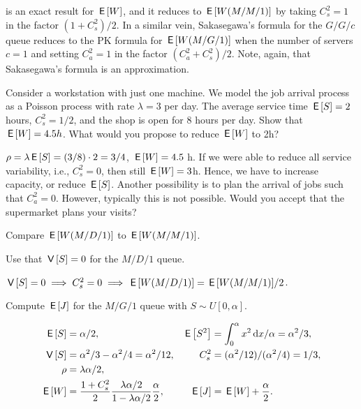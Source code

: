  is an exact result for $\,\mathsf{E}\left[W\right]$, and it reduces to $\,\mathsf{E}\left[W(M/M/1)\right]$ by taking
$C_s^2=1$ in the factor $(1+C_s^2)/2$.
In a similar vein, Sakasegawa's formula for the $G/G/c$ queue reduces to the PK formula for $\,\mathsf{E}\left[W(M/G/1)\right]$ when the number of servers $c=1$ and setting
 $C_a^2=1$ in the factor $(C_a^2+C_s^2)/2$.
Note, again, that Sakasegawa's formula is an approximation.




\begin{exercise}\label{ex:l-241}
 Consider a workstation with just one machine.
 We model the job arrival process as a Poisson process with rate $\lambda=3$ per day.
 The average service time $\,\mathsf{E}\left[S\right] = 2$ hours, $C^2_s = 1/2$, and the shop is open for 8 hours per day.
Show that  $\,\mathsf{E}\left[W\right] = 4.5h$. What would you propose to reduce $\,\mathsf{E}\left[W\right]$ to 2h?
\begin{solution}
$\rho = \lambda \,\mathsf{E}\left[S\right] = (3/8)\cdot 2 = 3/4$, $\,\mathsf{E}\left[W\right] = 4.5$ h.
If we were able to reduce all service variability, i.e., $C_s^2=0$, then still $\,\mathsf{E}\left[W\right] = 3$h.
Hence, we have to increase capacity, or reduce $\,\mathsf{E}\left[S\right]$.
Another possibility is to plan the arrival of jobs such that $C_a^2=0$.
However, typically this is not possible.
Would you accept that the supermarket plans your visits?
\end{solution}
\end{exercise}




\begin{exercise}
Compare  $\,\mathsf{E}\left[W(M/D/1)\right]$ to $\,\mathsf{E}\left[W(M/M/1)\right]$.
\begin{hint}
Use that $\,\mathsf{V}\left[S\right]=0$ for the $M/D/1$ queue.
\end{hint}
\begin{solution}
$\,\mathsf{V}\left[S\right] = 0 \implies C_s^2 = 0 \implies \,\mathsf{E}\left[W(M/D/1)\right] = {\,\mathsf{E}\left[W(M/M/1)\right]}/2$.
\end{solution}
\end{exercise}

\begin{exercise}
 Compute $\,\mathsf{E}\left[J\right]$ for the $M/G/1$ queue with $S\sim U[0,\alpha]$.
\begin{solution}
 \begin{align*}
\,\mathsf{E}\left[S\right] &= \alpha/2, & \,\mathsf{E}\left[S^2\right] &= \int_0^\alpha x^2 \,\textrm{d}x/\alpha = \alpha^2/3,\\
\,\mathsf{V}\left[S\right] &= \alpha^2/3 - \alpha^2/4= \alpha^2/12, & C_s^2 &= (\alpha^2/12)/(\alpha^2/4) = 1/3,\\
\rho &= \lambda \alpha/2,\\
\,\mathsf{E}\left[W\right] &= \frac{1+C_s^2}2 \frac{\lambda \alpha/2}{1-\lambda \alpha/2}\frac \alpha2, &
\,\mathsf{E}\left[J\right] &= \,\mathsf{E}\left[W\right] + \frac \alpha2.
 \end{align*}
\end{solution}
\end{exercise}


